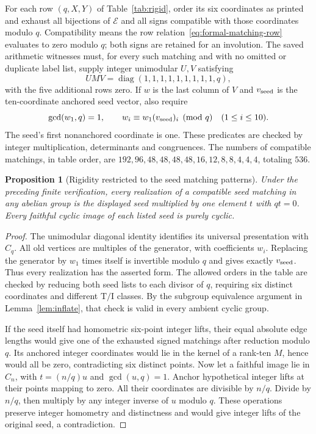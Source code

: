 \documentclass[11pt]{article}
\newtheorem{proposition}[theorem]{Proposition}
\theoremstyle{remark}
\newcommand{\TI}{\mathrm{T/I}}
\begin{document}
For each row $(q,X,Y)$ of Table~\ref{tab:rigid}, order its six coordinates
as printed and exhaust all bijections of $\mathcal E$ and all signs
compatible with those coordinates modulo $q$. Compatibility means the
row relation~\eqref{eq:formal-matching-row} evaluates to zero modulo $q$;
both signs are retained for an involution. The saved arithmetic witnesses
must, for every such matching and with no omitted or duplicate label list,
supply integer unimodular $U,V$ satisfying
\[
 UMV=\operatorname{diag}(1,1,1,1,1,1,1,1,1,q),
\]
with the five additional rows zero. If $w$ is the last column of $V$ and
$v_{\rm seed}$ is the ten-coordinate anchored seed vector, also require
\[
 \gcd(w_1,q)=1,\qquad w_i\equiv w_1(v_{\rm seed})_i\pmod q
 \quad(1\le i\le10).
\]
The seed's first nonanchored coordinate is one. These predicates are
checked by integer multiplication, determinants and congruences. The
numbers of compatible matchings, in table order, are
$192,96,48,48,48,48,16,12,8,8,4,4,4$, totaling $536$.

\begin{proposition}[Rigidity restricted to the seed matching patterns]
Under the preceding finite verification, every realization of a compatible
seed matching in any abelian group is the displayed seed multiplied by
one element $t$ with $qt=0$. Every faithful cyclic image of each listed
seed is purely cyclic.
\end{proposition}
\begin{proof}
The unimodular diagonal identity identifies its universal presentation
with $C_q$. All old vertices are multiples of the generator, with
coefficients $w_i$. Replacing the generator by $w_1$ times itself is
invertible modulo $q$ and gives exactly $v_{\rm seed}$. Thus every
realization has the asserted form. The allowed orders in the table are
checked by reducing both seed lists to each divisor of $q$, requiring
six distinct coordinates and different $\TI$ classes. By the subgroup
equivalence argument in Lemma~\ref{lem:inflate}, that check is valid in
every ambient cyclic group.

If the seed itself had homometric six-point integer lifts, their equal
absolute edge lengths would give one of the exhausted signed matchings
after reduction modulo $q$. Its anchored integer coordinates would lie
in the kernel of a rank-ten $M$, hence would all be zero, contradicting
six distinct points. Now let a faithful image lie in $C_n$, with
$t=(n/q)u$ and $\gcd(u,q)=1$. Anchor hypothetical integer lifts at their
points mapping to zero. All their coordinates are divisible by $n/q$.
Divide by $n/q$, then multiply by any integer inverse of $u$ modulo $q$.
These operations preserve integer homometry and distinctness and would
give integer lifts of the original seed, a contradiction.
\end{proof}
\end{document}
